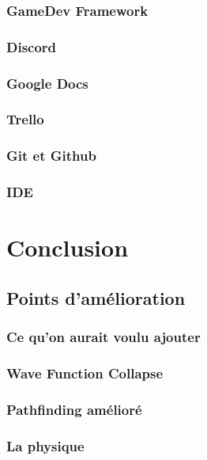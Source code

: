 \documentclass[10pt]{report}
\begin{document}
\subsubsection{GameDev Framework}
\subsubsection{Discord}
\subsubsection{Google Docs} %
\subsubsection{Trello}
\subsubsection{Git et Github}
\subsubsection{IDE}
\newpage

\section{Conclusion}
\subsection{Points d'amélioration}
\subsubsection{Ce qu'on aurait voulu ajouter}
\subsubsection{Wave Function Collapse}
\subsubsection{Pathfinding amélioré}
\subsubsection{La physique} %

\tableofcontents
\end{document}
